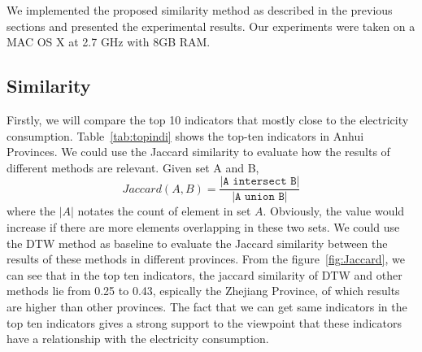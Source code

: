 We implemented the proposed similarity method as described in the previous sections and presented the experimental results. Our experiments were taken on a MAC OS X at 2.7 GHz with 8GB RAM.
\subsection{Similarity}
Firstly, we will compare the top 10 indicators that mostly close to the electricity consumption. Table~\ref{tab:topindi} shows the top-ten indicators in Anhui Provinces. We could use the Jaccard similarity to evaluate how the results of different methods are relevant. Given set A and B, 
\begin{equation}
	Jaccard(A, B) = \frac{\texttt{|A intersect B|}}{\texttt{|A union B|}}
\end{equation} 
where the $|A|$ notates the count of element in set $A$. Obviously, the value would increase if there are more elements overlapping in these two sets. We could use the DTW method as baseline to evaluate the Jaccard similarity between the results of these methods in different provinces. From the figure~\ref{fig:Jaccard}, we can see that in the top ten indicators, the jaccard similarity of DTW and other methods lie from 0.25 to 0.43, espically the Zhejiang Province, of which results are higher than other provinces. The fact that we can get same indicators in the top ten indicators gives a strong support to the viewpoint that these indicators have a relationship with the electricity consumption.



%
%


